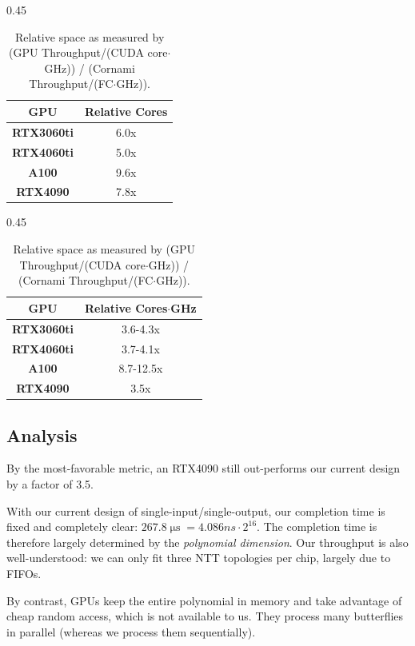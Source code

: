 \documentclass{article}
\DeclareMathOperator*{\us}{\mu\mathrm{s}}
\begin{document}
\begin{table}[H]
	\begin{subtable}[b]{0.45\textwidth}
		\centering
		\caption{Relative performance as measured by (GPU Throughput/CUDA core) / (Cornami Throughput/FC).}
		\begin{tabular}{ | c | c | }
			\hline
			GPU & Relative Cores \\
			\hline
			\textbf{RTX3060ti} & 6.0x \\
			\textbf{RTX4060ti} & 5.0x \\
			\textbf{A100} & 9.6x \\
			\textbf{RTX4090} & 7.8x \\
			\hline
		\end{tabular}
	\end{subtable}
	\hfill %
	\begin{subtable}[b]{0.45\textwidth}
		\centering
		\caption{Relative space as measured by (GPU Throughput/(CUDA core$\cdot$GHz)) / (Cornami Throughput/(FC$\cdot$GHz)).}
		\begin{tabular}{ | c | c | }
			\hline
			GPU & Relative Cores$\cdot$GHz \\
			\hline
			\textbf{RTX3060ti} & 3.6-4.3x \\
			\textbf{RTX4060ti} & 3.7-4.1x \\
			\textbf{A100} & 8.7-12.5x \\
			\textbf{RTX4090} & 3.5x \\
			\hline
		\end{tabular}
	\end{subtable}
\end{table}

\subsection{Analysis}
By the most-favorable metric, an RTX4090 still out-performs our current design by a factor of 3.5.

With our current design of single-input/single-output, our completion time is fixed and completely clear: $267.8\us = 4.086ns \cdot 2^{16} $. The completion time is therefore largely determined by the \emph{polynomial dimension}. Our throughput is also well-understood: we can only fit three NTT topologies per chip, largely due to FIFOs. 

By contrast, GPUs keep the entire polynomial in memory and take advantage of cheap random access, which is not available to us. They process many butterflies in parallel (whereas we process them sequentially).
\end{document}

